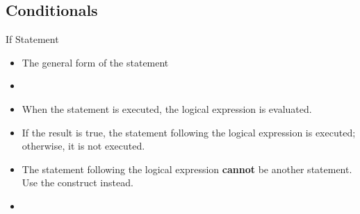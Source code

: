 \documentclass[10pt,t]{beamer}
\begin{document}
\subsection{Conditionals}
\begin{frame}[fragile]{If Statement}
  \begin{itemize}
    \item The general form of the  statement
    \item[] 
    \item When the  statement is executed, the logical expression is evaluated. 
    \item If the result is true, the statement following the logical expression is executed; otherwise, it is not executed.
    \item The statement following the logical expression \textbf{cannot} be another  statement. Use the  construct instead.
    \item[] 
  \end{itemize}
\end{frame}
\end{document}
